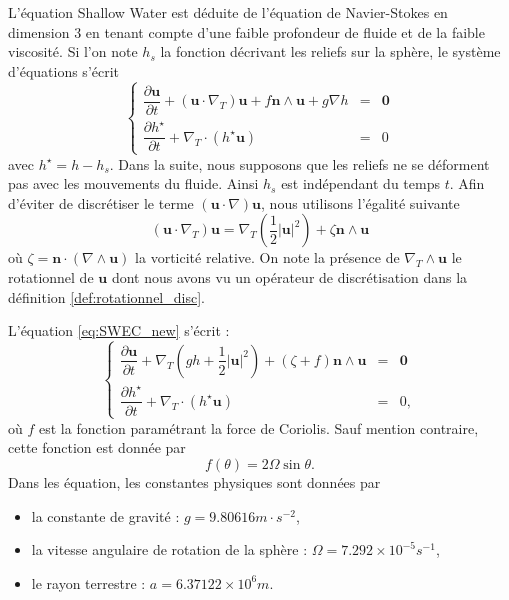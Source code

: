 L'équation Shallow Water est déduite de l'équation de Navier-Stokes en dimension 3 en tenant compte d'une faible profondeur de fluide et de la faible viscosité. Si l'on note $h_s$ la fonction décrivant les reliefs sur la sphère, le système d'équations s'écrit
\begin{equation}
\label{eq:SWEC_new}
\left\lbrace
\begin{array}{rcl}
\dfrac{\partial \mathbf{u}}{\partial t} + \left( \mathbf{u} \cdot \nabla_T \right) \mathbf{u} + f \mathbf{n} \wedge \mathbf{u} + g \nabla h & = & \mathbf{0} \\
\dfrac{\partial h^{\star}}{\partial t} + \nabla_T \cdot \left( h^{\star} \mathbf{u} \right) & = & 0
\end{array}
\right.
\end{equation}
avec $h^{\star} = h - h_s$. Dans la suite, nous supposons que les reliefs ne se déforment pas avec les mouvements du fluide. Ainsi $h_s$ est indépendant du temps $t$.
Afin d'éviter de discrétiser le terme $\left( \mathbf{u} \cdot \nabla \right) \mathbf{u}$, nous utilisons l'égalité suivante 
\begin{equation}
\left( \mathbf{u} \cdot \nabla_T \right) \mathbf{u} = \nabla_T \left( \dfrac{1}{2} |\mathbf{u}|^2 \right) + \zeta \mathbf{n} \wedge \mathbf{u}
\end{equation}
où $\zeta = \mathbf{n} \cdot \left( \nabla \wedge \mathbf{u} \right)$ la vorticité relative. On note la présence de $\nabla_T \wedge \mathbf{u}$ le rotationnel de $\mathbf{u}$ dont nous avons vu un opérateur de discrétisation dans la définition \ref{def:rotationnel_disc}.

L'équation \eqref{eq:SWEC_new} s'écrit :
\begin{equation}
\label{eq:SWEC_vectform}
\left\lbrace
\begin{array}{rcl}
\dfrac{\partial \mathbf{u}}{\partial t} + \nabla_T \left( g h + \dfrac{1}{2} |\mathbf{u}|^2  \right) + \left( \zeta + f \right) \mathbf{n} \wedge \mathbf{u} & = & \mathbf{0} \\
\dfrac{\partial h^{\star}}{\partial t} + \nabla_T \cdot \left( h^{\star} \mathbf{u} \right) & = & 0,
\end{array}
\right.
\end{equation}
où $f$ est la fonction paramétrant la force de Coriolis. Sauf mention contraire, cette fonction est donnée par
\begin{equation}
f(\theta) = 2 \Omega \sin \theta.
\end{equation}
Dans les équation, les constantes physiques sont données par
\begin{itemize}
\item la constante de gravité : $g=9.80616 m \cdot \si{s^{-2}}$,
\item la vitesse angulaire de rotation de la sphère : $\Omega=7.292 \times 10^{-5} \si{s^{-1}}$,
\item le rayon terrestre : $a=6.37122 \times 10^6 \si{m}$.
\end{itemize}

